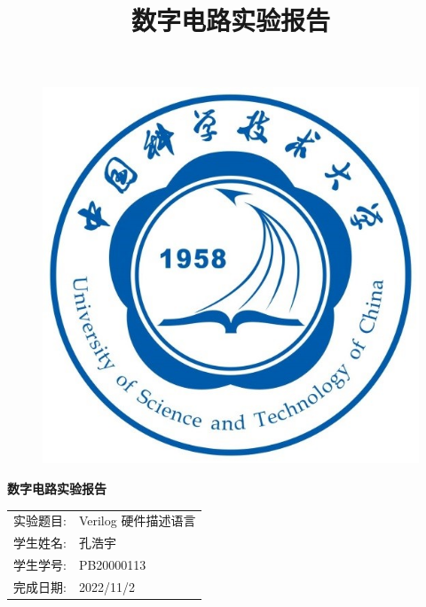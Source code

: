 \documentclass{article}
\title{\heiti 数字电路实验报告 }
\begin{document}
	\vspace*{1cm}
	
	\begin{figure}[h]
		\centering
		\includegraphics[scale=1.0]{xh.jpg}
	\end{figure}

	\vspace*{0.5cm}
	
	\begin{center}
		\Huge{\textbf{数字电路实验报告}}
	\end{center}
	
	\vspace{5cm}
	
	\begin{table}[h]
		\centering
		\begin{Large}
			\begin{tabular}{p{3cm} p{7cm}<{\centering}}
				实验题目: &  Verilog 硬件描述语言     \\ \cline{2-2}
				学生姓名:      & 孔浩宇   \\ \cline{2-2}
				学生学号: & PB20000113 \\ \cline{2-2}
				完成日期:       & 2022/11/2 \\ \cline{2-2}
			\end{tabular}
		\end{Large}		
	\end{table}
	\newpage
\end{document}
